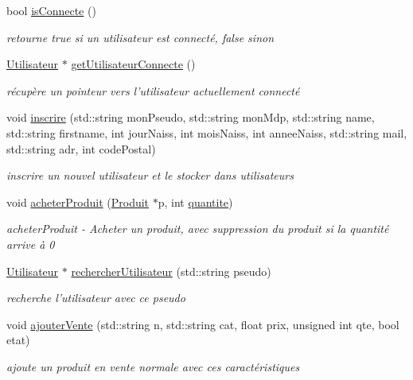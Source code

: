 \begin{DoxyCompactItemize}
bool \hyperlink{class_gestion_bdd_a86ee63900b31ef17bf487ebc1abe8634}{is\-Connecte} ()
\begin{DoxyCompactList}\small\item\em retourne true si un utilisateur est connecté, false sinon \end{DoxyCompactList}\item 
\hyperlink{class_utilisateur}{Utilisateur} $\ast$ \hyperlink{class_gestion_bdd_a2ca66731bc3b85a279d5b140e63ba838}{get\-Utilisateur\-Connecte} ()
\begin{DoxyCompactList}\small\item\em récupère un pointeur vers l'utilisateur actuellement connecté \end{DoxyCompactList}\item 
void \hyperlink{class_gestion_bdd_a02f362c2dd2ca487922e00988f71281b}{inscrire} (std\-::string mon\-Pseudo, std\-::string mon\-Mdp, std\-::string name, std\-::string firstname, int jour\-Naiss, int mois\-Naiss, int annee\-Naiss, std\-::string mail, std\-::string adr, int code\-Postal)
\begin{DoxyCompactList}\small\item\em inscrire un nouvel utilisateur et le stocker dans utilisateurs \end{DoxyCompactList}\item 
void \hyperlink{class_gestion_bdd_a039afce368e1b90cbc26334cb8c7d065}{acheter\-Produit} (\hyperlink{class_produit}{Produit} $\ast$p, int \hyperlink{class_gestion_bdd_aea2dfb9c9690c8aef62feb9936426588}{quantite})
\begin{DoxyCompactList}\small\item\em acheter\-Produit -\/ Acheter un produit, avec suppression du produit si la quantité arrive à 0 \end{DoxyCompactList}\item 
\hyperlink{class_utilisateur}{Utilisateur} $\ast$ \hyperlink{class_gestion_bdd_a59989c7d58166c7e4a451b77e56bb852}{rechercher\-Utilisateur} (std\-::string pseudo)
\begin{DoxyCompactList}\small\item\em recherche l'utilisateur avec ce pseudo \end{DoxyCompactList}\item 
void \hyperlink{class_gestion_bdd_ac8c3809d6de97f0e81cd5045a4a72c7e}{ajouter\-Vente} (std\-::string n, std\-::string cat, float prix, unsigned int qte, bool etat)
\begin{DoxyCompactList}\small\item\em ajoute un produit en vente normale avec ces caractéristiques \end{DoxyCompactList}\item 

\end{DoxyCompactItemize}
